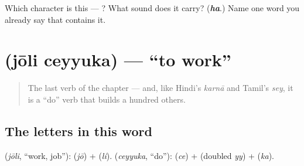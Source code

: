 \begin{tcolorbox}[breakable,colback=teal!4,colframe=teal!35!black,title={Before you move on}]
Which character is this — ? What sound does it carry? (\emph{\textbf{ha}}.) Name one word you already say that contains it.
\end{tcolorbox}
\section[\texorpdfstring{\ml{ജോലി} \ml{ചെയ്യുക} (jōli ceyyuka)}{ജോലി ചെയ്യുക (jōli ceyyuka)}]{  (jōli ceyyuka) — \textquotedblleft{}to work\textquotedblright{}}

\label{lesson:ML-C05-joli-ceyyuka}



\begin{quote}
The last verb of the chapter — and, like Hindi's \emph{karnā} and Tamil's \emph{sey}, it is a \textquotedblleft{}do\textquotedblright{} verb that builds a hundred others.
\end{quote}

\subsection*{The letters in this word}
\textbf{} (\emph{jōli}, \textquotedblleft{}work, job\textquotedblright{}): \textbf{} (\emph{jō}) + \textbf{} (\emph{li}). \textbf{} (\emph{ceyyuka}, \textquotedblleft{}do\textquotedblright{}): \textbf{} (\emph{ce}) + \textbf{} (doubled \emph{yy}) + \textbf{} (\emph{ka}).

